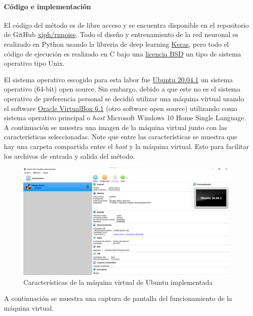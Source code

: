 \documentclass[conference,onecolumn]{IEEEtran}
\begin{document}
\paragraph{\textbf{Código e implementación}}
El código del método es de libre acceso y se encuentra disponible en el repositorio de GitHub \href{https://github.com/xiph/rnnoise}{xiph/rnnoise}. Todo el diseño y entrenamiento de la red neuronal es realizado en Python usando la libreria de deep learning \href{https://keras.io/}{Keras}, pero todo el código de ejecución es realizado en C bajo una \href{https://es.wikipedia.org/wiki/Licencia_BSD}{licencia BSD} un tipo de sistema operativo tipo Unix.

El sistema operativo escogido para esta labor fue \href{https://ubuntu.com/download/desktop}{Ubuntu 20.04.1} un sistema operativo (64-bit) open source. Sin embargo, debido a que este no es el sistema operativo de preferencia personal se decidió utilizar una máquina virtual usando el software \href{https://www.virtualbox.org/}{Oracle VirtualBox 6.1} (otro software open source) utilizando como sistema operativo principal o \textit{host} Microsoft Windows 10 Home Single Language. A continuación se muestra una imagen de la máquina virtual junto con las características seleccionadas. Note que entre las características se muestra que hay una carpeta compartida entre el \textit{host} y la máquina virtual. Esto para facilitar los archivos de entrada y salida del método.

 \begin{figure}[H]
 \centering
    \includegraphics[scale=0.45]{VM1.png}
    \caption{Características de la máquina virtual de Ubuntu implementada} 
\end{figure}

A continuación se muestra una captura de pantalla del funcionamiento de la máquina virtual.
\end{document}
